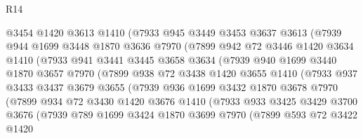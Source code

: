 \begin{lexlean}{R14}
\begin{coremodule}
              @3454
              @1420
              @3613
              @1410
              (@7933
                @945
                @3449
                @3453
                @3637
                @3613
                (@7939
                  @944
                  @1699
                  @3448
                  @1870
                  @3636
                  @7970
                  (@7899
                    @942
                    @72
                    @3446
                    @1420
                    @3634
                    @1410
                    (@7933
                      @941
                      @3441
                      @3445
                      @3658
                      @3634
                      (@7939
                        @940
                        @1699
                        @3440
                        @1870
                        @3657
                        @7970
                        (@7899
                          @938
                          @72
                          @3438
                          @1420
                          @3655
                          @1410
                          (@7933
                            @937
                            @3433
                            @3437
                            @3679
                            @3655
                            (@7939
                              @936
                              @1699
                              @3432
                              @1870
                              @3678
                              @7970
                              (@7899
                                @934
                                @72
                                @3430
                                @1420
                                @3676
                                @1410
                                (@7933
                                  @933
                                  @3425
                                  @3429
                                  @3700
                                  @3676
                                  (@7939
                                    @789
                                    @1699
                                    @3424
                                    @1870
                                    @3699
                                    @7970
                                    (@7899
                                      @593
                                      @72
                                      @3422
                                      @1420

\end{coremodule}
\end{lexlean}

